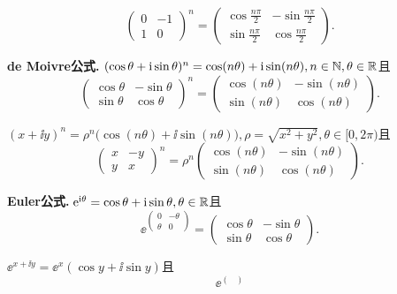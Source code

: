 \begin{mybox}
\begin{problem}
\begin{enum}
        \[
          \begin{pmatrix}
            0 & -1 \\
            1 & 0
          \end{pmatrix}^n = \begin{pmatrix}
            \cos\frac{n\pi}2 & - \sin\frac{n\pi}2 \\
            \sin\frac{n\pi}2 & \cos\frac{n\pi}2
          \end{pmatrix}.
        \]
    \item {\bfseries de Moivre公式.} $(\cos\theta+\mathrm i\sin\theta)^n=\cos(n\theta)+\mathrm i
        \sin(n\theta),n\in\mathbb N,\theta\in\mathbb R$且
        \[
          \begin{pmatrix}
            \cos\theta & -\sin\theta \\
            \sin\theta & \cos\theta
          \end{pmatrix}^n = \begin{pmatrix}
            \cos(n\theta) & -\sin(n\theta) \\
            \sin(n\theta) & \cos(n\theta)
          \end{pmatrix}.
        \]
    \item $(x+\ii y)^n=\rho^n\big(\cos(n\theta)+\ii
        \sin(n\theta)\big),\rho=\sqrt{x^2+y^2},\theta\in
        [0,2\pi)$且
        \[
          \begin{pmatrix}
            x & -y \\
            y & x
          \end{pmatrix}^n = \rho^n\begin{pmatrix}
            \cos(n\theta) & -\sin(n\theta) \\
            \sin(n\theta) & \cos(n\theta)
          \end{pmatrix}.
        \]
    \item {\bfseries Euler公式.} $\operatorname{\!\!\;\mathrm e}^ {\mathrm i\theta}=\cos\theta+\mathrm i\sin\theta,\theta\in\mathbb R$且
        \[
          \ee^{\begin{pmatrix}
            0 & -\theta \\
            \theta & 0
          \end{pmatrix}} = \begin{pmatrix}
            \cos\theta & -\sin\theta \\
            \sin\theta & \cos\theta
          \end{pmatrix}.
        \]
    \item $\ee^{x+\ii y}=\ee^x(\cos y+ \ii\sin y)$且
        \[
          \ee^{\begin{pmatrix}

\end{pmatrix}}\]
\end{enum}
\end{problem}
\end{mybox}
